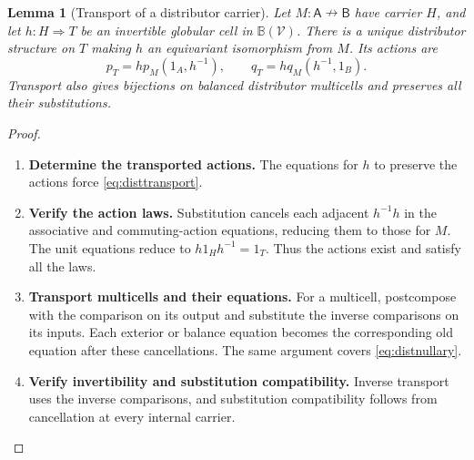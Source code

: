 \documentclass[11pt,reqno]{amsart}
\theoremstyle{plain}
\newtheorem{lemma}[theorem]{Lemma}
\theoremstyle{definition}
\theoremstyle{remark}
\numberwithin{equation}{section}
\newcommand{\V}{\mathcal V}
\newcommand{\harr}{\mathrel{\nrightarrow}}
\newcommand{\cell}{\mathrel{\Longrightarrow}}
\begin{document}
\begin{lemma}[Transport of a distributor carrier]\label{lem:distcarriertransport}
Let $M:\mathsf A\harr\mathsf B$ have carrier $H$, and let
$h:H\cell T$ be an invertible globular cell in $\mathbb B(\V)$.
There is a unique distributor structure on $T$ making $h$ an equivariant
isomorphism from $M$. Its actions are
\begin{equation}\label{eq:disttransport}
 p_T=h p_M(1_A,h^{-1}),\qquad
 q_T=h q_M(h^{-1},1_B).
\end{equation}
Transport also gives bijections on balanced distributor multicells and
preserves all their substitutions.
\end{lemma}
\begin{proof}\leavevmode
\begin{enumerate}
\item \textbf{Determine the transported actions.} The equations for $h$ to preserve the actions force
\cref{eq:disttransport}.

\item \textbf{Verify the action laws.} Substitution cancels each adjacent
$h^{-1}h$ in the associative and commuting-action equations, reducing
them to those for $M$. The unit equations reduce to
$h1_Hh^{-1}=1_T$. Thus the actions exist and satisfy all the laws.

\item \textbf{Transport multicells and their equations.} For a multicell, postcompose with the comparison on its output and
substitute the inverse comparisons on its inputs. Each exterior or
balance equation becomes the corresponding old equation after these
cancellations. The same argument covers \cref{eq:distnullary}.

\item \textbf{Verify invertibility and substitution compatibility.} Inverse transport uses the inverse comparisons, and substitution
compatibility follows from cancellation at every internal carrier.\qedhere
\end{enumerate}
\end{proof}
\end{document}
